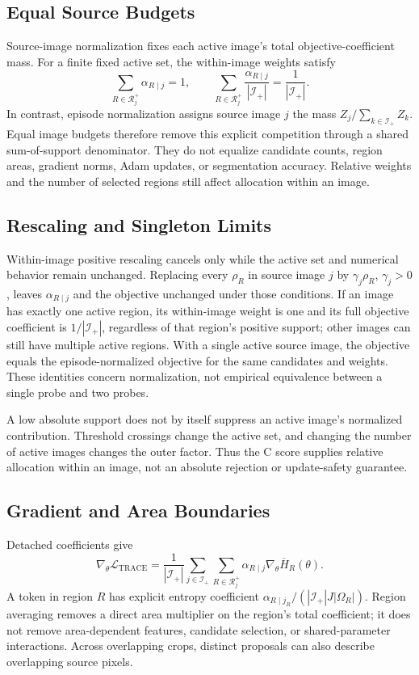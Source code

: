 \subsection{Equal Source Budgets}
Source-image normalization fixes each active image's total objective-coefficient mass. For a finite fixed active set, the within-image weights satisfy
\begin{equation}
\sum_{R\in\mathcal R_j^+}\alpha_{R\mid j}=1,\qquad
\sum_{R\in\mathcal R_j^+}\frac{\alpha_{R\mid j}}{|\mathcal I_+|}
=\frac1{|\mathcal I_+|}.
\end{equation}
In contrast, episode normalization assigns source image $j$ the mass $Z_j/\sum_{k\in\mathcal I_+}Z_k$. Equal image budgets therefore remove this explicit competition through a shared sum-of-support denominator. They do not equalize candidate counts, region areas, gradient norms, Adam updates, or segmentation accuracy. Relative weights and the number of selected regions still affect allocation within an image.

\subsection{Rescaling and Singleton Limits}
Within-image positive rescaling cancels only while the active set and numerical behavior remain unchanged. Replacing every $\rho_R$ in source image $j$ by $\gamma_j\rho_R$, $\gamma_j>0$, leaves $\alpha_{R\mid j}$ and the objective unchanged under those conditions. If an image has exactly one active region, its within-image weight is one and its full objective coefficient is $1/|\mathcal I_+|$, regardless of that region's positive support; other images can still have multiple active regions. With a single active source image, the objective equals the episode-normalized objective for the same candidates and weights. These identities concern normalization, not empirical equivalence between a single probe and two probes.

A low absolute support does not by itself suppress an active image's normalized contribution. Threshold crossings change the active set, and changing the number of active images changes the outer factor. Thus the C score supplies relative allocation within an image, not an absolute rejection or update-safety guarantee.

\subsection{Gradient and Area Boundaries}
Detached coefficients give
\begin{equation}
\nabla_\theta\mathcal L_{\mathrm{TRACE}}
=\frac1{|\mathcal I_+|}\sum_{j\in\mathcal I_+}
\sum_{R\in\mathcal R_j^+}\alpha_{R\mid j}
\nabla_\theta\overline H_R(\theta).
\end{equation}
A token in region $R$ has explicit entropy coefficient
$\alpha_{R\mid j_R}/(|\mathcal I_+|J|\Omega_R|)$.
Region averaging removes a direct area multiplier on the region's total coefficient; it does not remove area-dependent features, candidate selection, or shared-parameter interactions. Across overlapping crops, distinct proposals can also describe overlapping source pixels.

